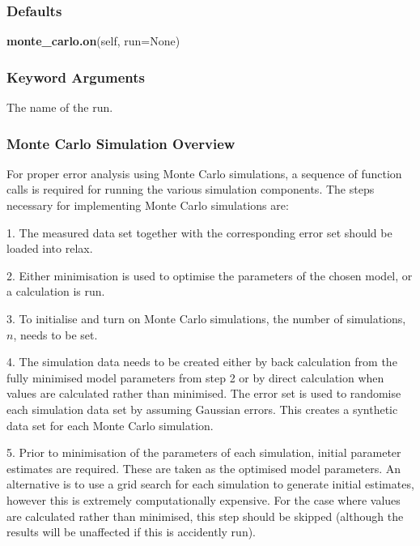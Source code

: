 \subsubsection{Defaults}

\textsf{\textbf{monte\_carlo.on}(self, run=None)}


\subsubsection{Keyword Arguments}


  The name of the run.


\subsubsection{Monte Carlo Simulation Overview}

For proper error analysis using Monte Carlo simulations, a sequence  of function calls is
required for running the various simulation components.  The steps necessary for
implementing Monte Carlo simulations are:

1.  The measured data set together with the corresponding error set should be loaded into
relax.

2.  Either minimisation  is used to optimise  the parameters of the chosen model, or a
calculation is run.

3.  To initialise and turn on Monte Carlo simulations, the number of simulations, $n$, needs
to be set.

4.  The simulation data needs to be created either by back calculation from the fully
minimised  model parameters from step 2 or by direct calculation when values are calculated
rather than minimised.   The error set is used to randomise each simulation data set by
assuming Gaussian errors.  This creates a synthetic data set for each Monte Carlo
simulation.

5.  Prior to minimisation  of the parameters of each simulation, initial parameter estimates
are required.  These are taken as the optimised  model parameters.  An alternative is to use
a grid search for each simulation to generate initial estimates, however this is extremely
computationally expensive.  For the case where values are calculated rather than minimised, 
this step should be skipped (although the results will be unaffected if this is accidently
run).

